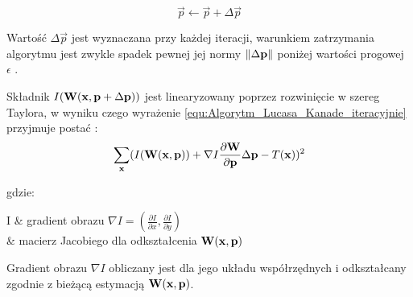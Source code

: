 \begin{equation}
\label{equ:Algorytm_Lucasa_Kanade_podstawienie}
	\vec{p} \gets \vec{p} + \Delta \vec{p}
\end{equation}

Wartość $\Delta \vec{p}$ jest wyznaczana przy każdej iteracji, warunkiem zatrzymania algorytmu jest zwykle spadek pewnej jej normy $\lVert\Delta \mathbf{p}\rVert$ poniżej wartości progowej $\epsilon$ \cite{Baker2004}. 

Składnik $I(\mathbf{W}(\mathbf{x}, \mathbf{p} + \Delta \mathbf{p}))$ jest linearyzowany poprzez rozwinięcie w szereg Taylora, w wyniku czego wyrażenie \ref{equ:Algorytm_Lucasa_Kanade_iteracyjnie} przyjmuje postać \cite{Baker2004}:
\begin{equation}
\label{equ:Algorytm_Lucasa_Kanade_Taylor}
	\sum\limits_{\mathbf{x}} (I(\mathbf{W}(\mathbf{x}, \mathbf{p})) + \nabla I \frac{\partial \mathbf{W}}{\partial \mathbf{p}} \Delta \mathbf{p} - T(\mathbf{x}))^2
\end{equation}

\noindent
gdzie:

\begin{conditions}
	\nabla I & gradient obrazu $\nabla I = (\frac{\partial I}{\partial x}, \frac{\partial I}{\partial y})$ \\
	 & macierz Jacobiego dla odkształcenia $\mathbf{W}(\mathbf{x}, \mathbf{p})$ \\
\end{conditions}

Gradient obrazu $\nabla I$ obliczany jest dla jego układu współrzędnych i odkształcany zgodnie z bieżącą estymacją $\mathbf{W}(\mathbf{x}, \mathbf{p})$.

